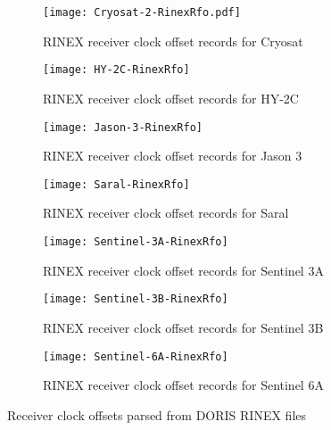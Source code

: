\begin{figure}
\begin{subfigure}{0.45\textwidth}
  \centering
  \texttt{[image: Cryosat-2-RinexRfo.pdf]}  
  \caption{RINEX receiver clock offset records for Cryosat}
  \label{fig:sub-first}
\end{subfigure}
\begin{subfigure}{0.45\textwidth}
  \centering
  \texttt{[image: HY-2C-RinexRfo]}  
  \caption{RINEX receiver clock offset records for HY-2C}
  \label{fig:sub-first}
\end{subfigure}
\begin{subfigure}{0.45\textwidth}
  \centering
  \texttt{[image: Jason-3-RinexRfo]}  
  \caption{RINEX receiver clock offset records for Jason 3}
  \label{fig:sub-first}
\end{subfigure}
\begin{subfigure}{0.45\textwidth}
  \centering
  \texttt{[image: Saral-RinexRfo]}  
  \caption{RINEX receiver clock offset records for Saral}
  \label{fig:sub-first}
\end{subfigure}
\begin{subfigure}{0.45\textwidth}
  \centering
  \texttt{[image: Sentinel-3A-RinexRfo]}  
  \caption{RINEX receiver clock offset records for Sentinel 3A}
  \label{fig:sub-first}
\end{subfigure}
\begin{subfigure}{0.45\textwidth}
  \centering
  \texttt{[image: Sentinel-3B-RinexRfo]}  
  \caption{RINEX receiver clock offset records for Sentinel 3B}
  \label{fig:sub-first}
\end{subfigure}
\begin{subfigure}{0.45\textwidth}
  \centering
  \texttt{[image: Sentinel-6A-RinexRfo]}  
  \caption{RINEX receiver clock offset records for Sentinel 6A}
  \label{fig:sub-first}
\end{subfigure}
\caption{Receiver clock offsets parsed from DORIS RINEX files}
\label{fig:onw-week-rfo}
\end{figure}